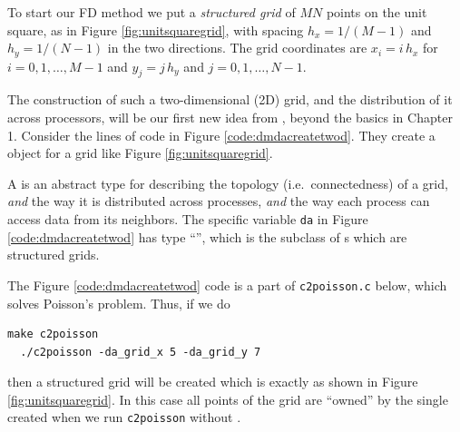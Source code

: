 To start our FD method we put a \emph{structured grid} of $MN$ points on the unit square, as in Figure \ref{fig:unitsquaregrid}, with spacing $h_x=1/(M-1)$ and $h_y=1/(N-1)$ in the two directions.  The grid coordinates are $x_i = i\, h_x$ for $i = 0,1,\dots,M-1$ and $y_j = j\, h_y$ and $j=0,1,\dots,N-1$.

The construction of such a two-dimensional (2D) grid, and the distribution of it across processors, will be our first new idea from \PETSc, beyond the basics in Chapter 1.  Consider the lines of code in Figure \ref{code:dmdacreatetwod}.  They create a \PETSc \pDM object for a grid like Figure \ref{fig:unitsquaregrid}.

\clearpage
{}

A \pDM is an abstract type for describing the topology (i.e.~connectedness) of a grid, \emph{and} the way it is distributed across \MPI processes, \emph{and} the way each process can access data from its neighbors.  The specific variable \texttt{da} in Figure \ref{code:dmdacreatetwod} has type ``\pDMDA'', which is the subclass of \pDM s which are structured grids.

The Figure \ref{code:dmdacreatetwod} code is a part of \texttt{c2poisson.c} below, which solves Poisson's problem.  Thus, if we do
\begin{Verbatim}[fontsize=\small]
  make c2poisson
  ./c2poisson -da_grid_x 5 -da_grid_y 7
\end{Verbatim}
then a structured grid will be created which is exactly as shown in Figure \ref{fig:unitsquaregrid}.  In this case all points of the grid are ``owned'' by the single created when we run \texttt{c2poisson} without \MPI.


